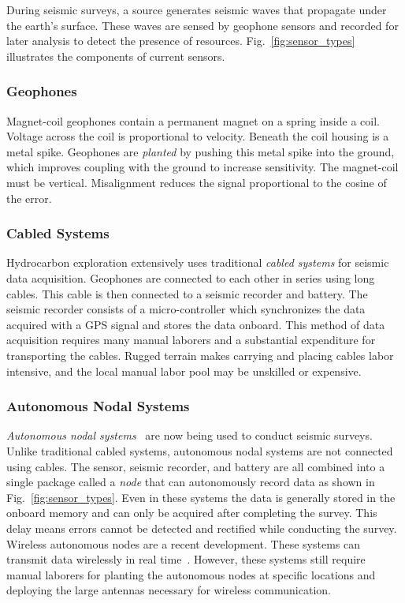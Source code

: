 During seismic surveys, a source generates seismic waves that propagate under the earth's surface. 
These waves are sensed by geophone sensors and recorded for later analysis to detect the presence of resources. 
Fig.~\ref{fig:sensor_types} illustrates the components of current sensors. 

\subsubsection{Geophones}
Magnet-coil geophones contain a permanent magnet on a spring inside a coil. Voltage across the coil is proportional to velocity. 
 Beneath the coil housing is a metal spike. 
  Geophones are \emph{planted} by pushing this metal spike into the ground, which improves coupling with the ground to increase sensitivity. 
 The magnet-coil must be vertical. 
  Misalignment reduces the signal proportional to the cosine of the error.


\subsubsection{Cabled Systems}
Hydrocarbon exploration extensively uses traditional \emph{cabled systems} for seismic data acquisition.
Geophones are connected to each other in series using long cables. This cable is then connected to a seismic recorder and battery. 
The seismic recorder consists of a micro-controller which synchronizes the data acquired with a GPS signal and stores the data onboard. 
This method of data acquisition requires many manual laborers and a substantial expenditure for transporting the cables. 
Rugged terrain makes carrying and placing cables labor intensive, and the local manual labor pool may be unskilled or expensive.
   
\subsubsection{Autonomous Nodal Systems}
\emph{Autonomous nodal systems}~\cite{wood1998distributed} are now being used to conduct seismic surveys.
Unlike traditional cabled systems, autonomous nodal systems are not connected using cables.
The sensor, seismic recorder, and battery are all combined into a single package called a \emph{node} that can autonomously record data as shown in Fig.~\ref{fig:sensor_types}.
Even in these systems the data is generally stored in the onboard memory and can only be acquired after completing the survey.
This delay means errors cannot be detected and rectified while conducting the survey. 
Wireless autonomous nodes are a recent development.
These systems can transmit data wirelessly in real time~\cite{jiang2015geophysical}.
However, these systems still require manual laborers for planting the autonomous nodes at specific locations and deploying the large antennas necessary for wireless communication.
 
